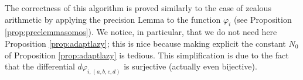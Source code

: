 \documentclass[11pt]{article}
\numberwithin{equation}{section}
\numberwithin{figure}{section}
\theoremstyle{definition}
\begin{document}
\noindent 
The correctness of this algorithm is proved similarly to the case of 
zealous arithmetic by applying the precision Lemma to the function 
$\varphi_i$ (see Proposition \ref{prop:preclemmasomos}). We notice, in 
particular, that we do not need here Proposition \ref{prop:adaptlazy}; 
this is nice because making explicit the constant $N_0$ of 
Proposition \ref{prop:adaptlazy} is tedious. This simplification is
due to the fact that the differential $d \varphi_{i,(a,b,c,d)}$ is
surjective (actually even bijective).


\end{document}
